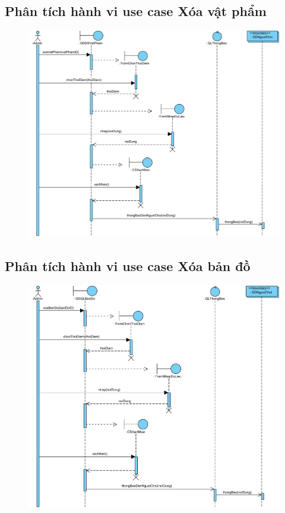 \documentclass[3p]{elsarticle}
\begin{document}
\subsection{Phân tích hành vi use case Xóa vật phẩm}
\begin{figure}[!htbp]
	\hspace*{-.5in}
	\centering
	\includegraphics[scale=.55]{images/sequence-pdfs/admin/deleteItem.pdf}
\end{figure}
\newpage

\subsection{Phân tích hành vi use case Xóa bản đồ}
\begin{figure}[!htbp]
	\hspace*{-.5in}
	\centering
	\includegraphics[scale=.55]{images/sequence-pdfs/admin/deleteMap.pdf}
\end{figure}
\newpage
\end{document}
